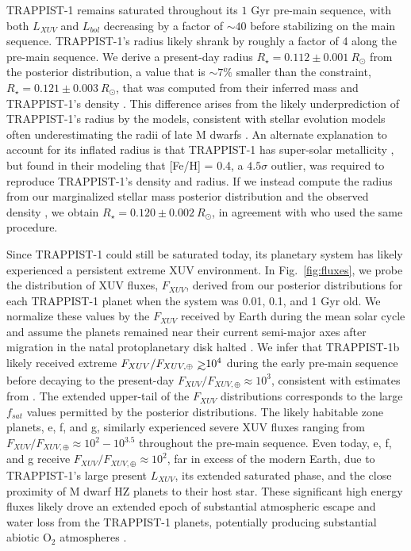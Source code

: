 \documentclass[twocolumn]{aastex62}
\def\gsim{~\rlap{$>$}{\lower 1.0ex\hbox{$\sim$}}}
\begin{document}
TRAPPIST-1 remains saturated throughout its $1$ Gyr pre-main sequence, with both $L_{XUV}$ and $L_{bol}$ decreasing by a factor of ${\sim}40$ before stabilizing on the main sequence. TRAPPIST-1's radius likely shrank by roughly a factor of 4 along the pre-main sequence. We derive a present-day radius $R_{\star} = 0.112 \pm{0.001} \ R_{\odot}$ from the posterior distribution, a value that is ${\sim} 7\%$ smaller than the \citet{vanGrootel2018} constraint, $R_{\star} = 0.121 \pm {0.003} \ R_{\odot}$, that was computed from their inferred mass and TRAPPIST-1's density \citep{Delrez2018}. This difference arises from the likely underprediction of TRAPPIST-1's radius by the \citet{Baraffe2015} models, consistent with stellar evolution models often underestimating the radii of late M dwarfs \citep{Reid2005,Spada2013}. An alternate explanation to account for its inflated radius is that TRAPPIST-1 has super-solar metallicity \citep{Burgasser2017,vanGrootel2018}, but \citet{vanGrootel2018} found in their modeling that [Fe/H] = 0.4, a $4.5\sigma$ outlier, was required to reproduce TRAPPIST-1's density and radius. If we instead compute the radius from our marginalized stellar mass posterior distribution and the observed density \citep{Delrez2018}, we obtain $R_{\star} = 0.120 \pm{0.002} \ R_{\odot}$, in agreement with \citet{vanGrootel2018} who used the same procedure.

Since TRAPPIST-1 could still be saturated today, its planetary system has likely experienced a persistent extreme XUV environment. In Fig.~\ref{fig:fluxes}, we probe the distribution of XUV fluxes, $F_{XUV}$, derived from our posterior distributions for each TRAPPIST-1 planet when the system was 0.01, 0.1, and 1 Gyr old. We normalize these values by the $F_{XUV}$ received by Earth during the mean solar cycle \citep[$F_{XUV,\oplus} = 3.88$ erg s$^{-1}$cm$^{-2}$,][]{Ribas2005} and assume the planets remained near their current semi-major axes after migration in the natal protoplanetary disk halted \citep{Luger2017}. We infer that TRAPPIST-1b likely received extreme $F_{XUV}/F_{XUV, \oplus} \gsim 10^4$ during the early pre-main sequence before decaying to the present-day $F_{XUV}/F_{XUV, \oplus} \approx 10^3$, consistent with estimates from \citet{Wheatley2017}. The extended upper-tail of the $F_{XUV}$ distributions corresponds to the large $f_{sat}$ values permitted by the posterior distributions. The likely habitable zone planets, e, f, and g, similarly experienced severe XUV fluxes ranging from $F_{XUV}/F_{XUV, \oplus} \approx 10^2 - 10^{3.5}$ throughout the pre-main sequence. Even today, e, f, and g receive $F_{XUV}/F_{XUV, \oplus} \approx 10^2$, far in excess of the modern Earth, due to TRAPPIST-1's large present $L_{XUV}$, its extended saturated phase, and the close proximity of M dwarf HZ planets to their host star. These significant high energy fluxes likely drove an extended epoch of substantial atmospheric escape and water loss from the TRAPPIST-1 planets, potentially producing substantial abiotic O$_2$ atmospheres \citep{Luger2015,Bolmont2017,Bourrier2017a}.
\end{document}
